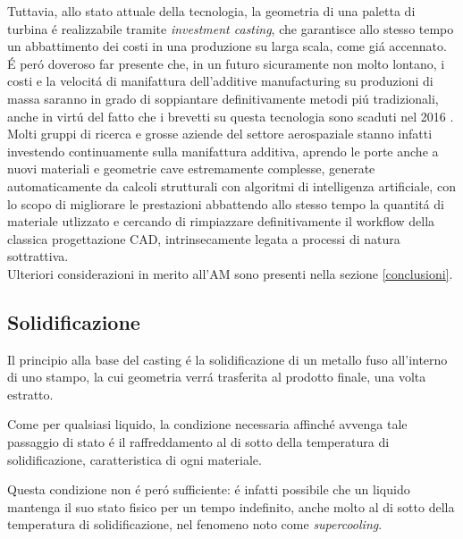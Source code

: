 \documentclass{article}
\begin{document}
    Tuttavia, allo stato attuale della tecnologia, la geometria di una paletta di turbina é realizzabile tramite
    \textit{investment casting}, che garantisce allo stesso tempo un abbattimento dei costi in una produzione
    su larga scala, come giá accennato.\\ 

    É peró doveroso far presente che, in un futuro sicuramente non molto lontano, i costi e la velocitá di manifattura
    dell'additive manufacturing su produzioni di massa saranno in grado di soppiantare definitivamente metodi piú tradizionali,
    anche in virtú del fatto che i brevetti su questa tecnologia sono scaduti nel 2016 \autocite{Latvian_additive}. 
    Molti gruppi di ricerca e grosse aziende del settore aerospaziale
    stanno infatti investendo continuamente sulla manifattura additiva,
    aprendo le porte anche a nuovi materiali e geometrie cave estremamente complesse, 
    generate automaticamente da calcoli strutturali con algoritmi di intelligenza artificiale, 
    con lo scopo di migliorare le prestazioni abbattendo allo stesso
    tempo la quantitá di materiale utlizzato e 
    cercando di rimpiazzare definitivamente il workflow della classica progettazione CAD, 
    intrinsecamente legata a processi di natura sottrattiva. \\ 

    Ulteriori considerazioni in merito all'AM sono presenti nella sezione \ref{conclusioni}.



    

    \clearpage

        \subsection{Solidificazione\label{Casting_solid}}

        Il principio alla base del casting é la solidificazione di un metallo fuso all'interno di uno
        stampo, la cui geometria verrá trasferita al prodotto finale, una volta estratto.

        Come per qualsiasi liquido, la condizione necessaria affinché
        avvenga tale passaggio di stato é il raffreddamento al di sotto della temperatura di solidificazione, 
        caratteristica di ogni materiale. 
        
        Questa condizione non é peró sufficiente: é infatti possibile che un liquido mantenga il suo 
        stato fisico per un tempo indefinito, anche molto al di sotto della temperatura di solidificazione, 
        nel fenomeno noto come \textit{supercooling}.
\end{document}
